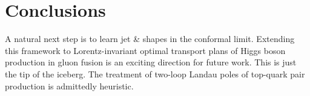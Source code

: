 \section{Conclusions}\label{sec:conclusions}

A natural next step is to learn jet & shapes in the conformal limit.
Extending this framework to Lorentz-invariant optimal transport plans of
Higgs boson production in gluon fusion is an exciting direction for
future work. This is just the tip of the iceberg. The treatment of
two-loop Landau poles of top-quark pair production is admittedly
heuristic.

